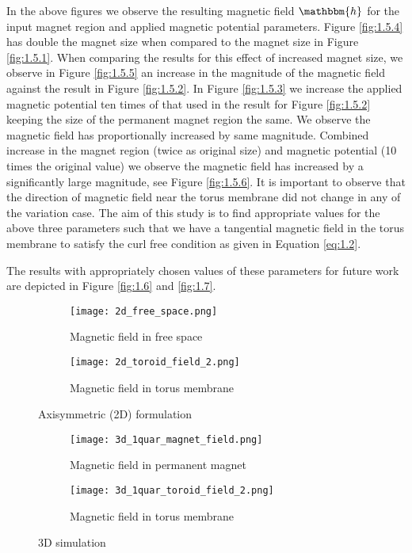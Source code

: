 In the above figures we observe the resulting magnetic field $\mathbbm{h}$ for the input magnet region and applied magnetic potential parameters. Figure \eqref{fig:1.5.4} has double the magnet size when compared to the magnet size in Figure \eqref{fig:1.5.1}. When comparing the results for this effect of increased magnet size, we observe in Figure \eqref{fig:1.5.5} an increase in the magnitude of the magnetic field against the result in Figure \eqref{fig:1.5.2}. In Figure \eqref{fig:1.5.3} we increase the applied magnetic potential ten times of that used in the result for Figure \eqref{fig:1.5.2} keeping the size of the permanent magnet region the same. We observe the magnetic field has proportionally increased by same magnitude. Combined increase in the magnet region (twice as original size) and magnetic potential (10 times the original value) we observe the magnetic field has increased by a significantly large magnitude, see Figure \eqref{fig:1.5.6}. It is important to observe that the direction of magnetic field near the torus membrane did not change in any of the variation case. The aim of this study is to find appropriate values for the above three parameters such that we have a tangential magnetic field in the torus membrane to satisfy the curl free condition as given in Equation \eqref{eq:1.2}. \par 

The results with appropriately chosen values of these parameters for future work are depicted in Figure \eqref{fig:1.6} and \eqref{fig:1.7}.

\begin{figure}[h]
\centering
\begin{subfigure}{0.49\textwidth}
\centering
\texttt{[image: 2d\_free\_space.png]}
\caption{Magnetic field in free space}
\label{fig:1.6.1}
\end{subfigure}
\begin{subfigure}{0.49\textwidth}
\centering
\texttt{[image: 2d\_toroid\_field\_2.png]}
\caption{Magnetic field in torus membrane}
\label{fig:1.6.2}
\end{subfigure}
\caption{Axisymmetric (2D) formulation}
\label{fig:1.6}
\end{figure}

\begin{figure}[h]
\centering
\begin{subfigure}{0.49\textwidth}
\centering
\texttt{[image: 3d\_1quar\_magnet\_field.png]}
\caption{Magnetic field in permanent magnet}
\label{fig:1.7.1}
\end{subfigure}
\begin{subfigure}{0.49\textwidth}
\centering
\texttt{[image: 3d\_1quar\_toroid\_field\_2.png]}
\caption{Magnetic field in torus membrane}
\label{fig:1.7.2}
\end{subfigure}
\caption{3D simulation}
\label{fig:1.7}
\end{figure}
